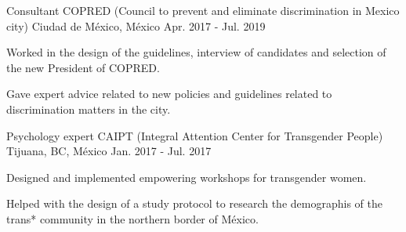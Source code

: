 \begin{cventries}
    \cventry
        {Consultant}
        {COPRED (Council to prevent and eliminate discrimination in Mexico city)}
        {Ciudad de México, México}
        {Apr. 2017 - Jul. 2019}
        {
            \begin{cvitems}
                \item {Worked in the design of the guidelines, interview of candidates and selection of the new President of COPRED.}
                \item {Gave expert advice related to new policies and guidelines related to discrimination matters in the city.}
            \end{cvitems}
        }
    \cventry
        {Psychology expert}
        {CAIPT (Integral Attention Center for Transgender People)}
        {Tijuana, BC, México}
        {Jan. 2017 - Jul. 2017}
        {
            \begin{cvitems}
                \item {Designed and implemented empowering workshops for transgender women.}
                \item {Helped with the design of a study protocol to research the demographis of the trans* community in the northern border of México.}
            \end{cvitems}
        }
\end{cventries}
